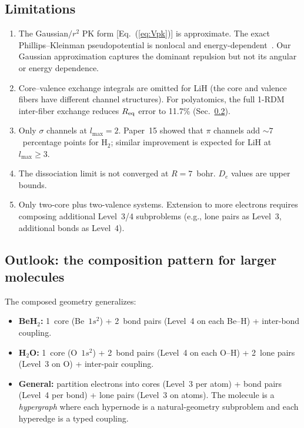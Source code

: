 \documentclass[aps,pra,twocolumn,superscriptaddress,longbibliography,floatfix]{revtex4-2}
\begin{document}
\subsection{Limitations}
\label{sec:limitations}

\begin{enumerate}
\item The Gaussian$/r^2$ PK form [Eq.~(\ref{eq:Vpk})] is approximate.
  The exact Phillips--Kleinman pseudopotential is nonlocal and
  energy-dependent~\cite{pk1959}.  Our Gaussian approximation captures
  the dominant repulsion but not its angular or energy dependence.

\item Core--valence exchange integrals are omitted for LiH (the core
  and valence fibers have different channel structures).  For
  polyatomics, the full 1-RDM inter-fiber exchange reduces
  $R_{\rm eq}$ error to 11.7\% (Sec.~\ref{sec:outlook}).

\item Only $\sigma$ channels at $l_{\max} = 2$.  Paper~15 showed that
  $\pi$ channels add ${\sim}7$~percentage points for H$_2$; similar
  improvement is expected for LiH at $l_{\max} \geq 3$.

\item The dissociation limit is not converged at $R = 7$~bohr.
  $D_e$ values are upper bounds.

\item Only two-core plus two-valence systems.  Extension to more
  electrons requires composing additional Level~3/4 subproblems (e.g.,
  lone pairs as Level~3, additional bonds as Level~4).
\end{enumerate}


\subsection{Outlook: the composition pattern for larger molecules}
\label{sec:outlook}

The composed geometry generalizes:
\begin{itemize}
  \item \textbf{BeH$_2$:} 1~core (Be~$1s^2$) + 2~bond pairs (Level~4
    on each Be--H) + inter-bond coupling.
  \item \textbf{H$_2$O:} 1~core (O~$1s^2$) + 2~bond pairs (Level~4 on
    each O--H) + 2~lone pairs (Level~3 on O) + inter-pair coupling.
  \item \textbf{General:} partition electrons into cores (Level~3 per
    atom) + bond pairs (Level~4 per bond) + lone pairs (Level~3 on atoms).
    The molecule is a \emph{hypergraph} where each hypernode is a
    natural-geometry subproblem and each hyperedge is a typed coupling.
\end{itemize}
\end{document}
